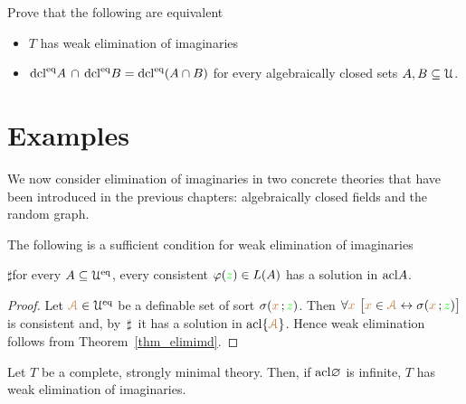 
\begin{exercise}
  Prove that the following are equivalent
  \begin{itemize}
  \item[1.] $T$ has weak elimination of imaginaries
  \item[2.] ${\rm dcl}^{{\rm eq}} A\,\cap\,{\rm dcl}^{{\rm eq}} B={\rm dcl}^{{\rm eq}}(A\cap B)$ for every algebraically closed sets $A,B\subseteq\EuScript U$.
 \end{itemize}
\end{exercise}

\section{Examples}

We now consider elimination of imaginaries in two concrete theories that have been introduced in the previous chapters: 
algebraically closed fields and the random graph.

\begin{lemma}\label{tvtestimmaginari}
The following is a sufficient condition for weak elimination of imaginaries

$\sharp$\qquad for every $A\subseteq\EuScript U^{{\rm eq}}$, every consistent $\varphi({\color{green} z})\in L(A)$ has a solution in ${\rm acl} A$.
\end{lemma}

\begin{proof}
Let ${\color{brown}\EuScript A}\in\EuScript U^{{\rm eq}}$ be a definable set of sort $\sigma({\color{brown} x}\,;{\color{green} z})$.
Then $\forall{\color{brown}x}\ \big[{\color{brown} x}\in{\color{brown}\EuScript A}\leftrightarrow\sigma({\color{brown} x}\,;{\color{green} z})\big]$ is consistent and, by $\,\sharp\,$ it has a solution in ${\rm acl}\{{\color{brown}\EuScript A}\}$.
Hence weak elimination follows from Theorem~\ref{thm_elimimd}.
\end{proof}

\begin{theorem}\label{elimimsm} 
Let $T$ be a complete, strongly minimal theory.
Then, if ${\rm acl}\varnothing$ is infinite, $T$ has weak elimination of imaginaries.
\end{theorem}

